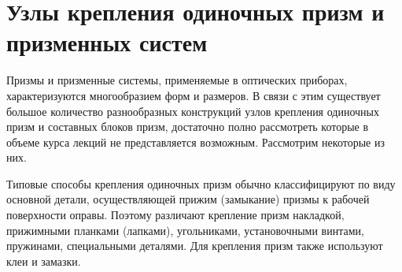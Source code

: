 \section[Узлы крепления одиночных призм и призменных систем]{Узлы крепления одиночных призм и\\ призменных систем}

Призмы и призменные системы, применяемые в оптических приборах, характеризуются многообразием форм и размеров. В связи с этим существует большое количество разнообразных конструкций узлов крепления одиночных призм и составных блоков призм, достаточно полно рассмотреть которые в объеме курса лекций не представляется возможным. Рассмотрим некоторые из них.

Типовые способы крепления одиночных призм обычно классифицируют по виду основной детали, осуществляющей прижим (замыкание) призмы к рабочей поверхности оправы. Поэтому различают крепление призм накладкой, прижимными планками (лапками), угольниками, установочными винтами, пружинами, специальными деталями. Для крепления призм также используют клеи и замазки.

